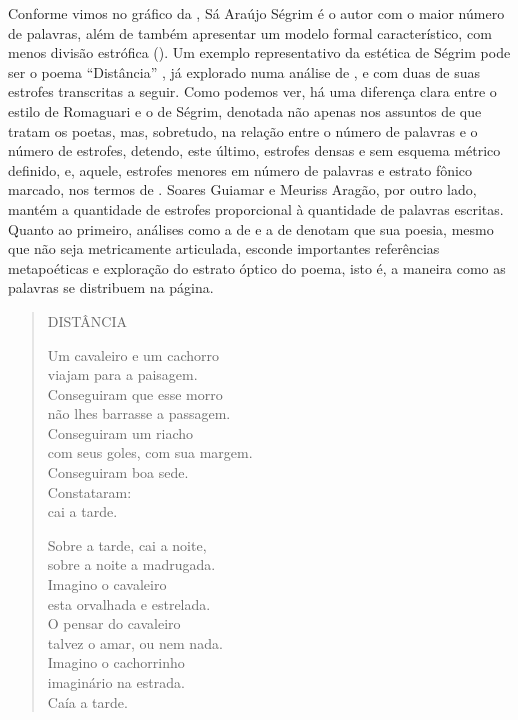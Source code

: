 \documentclass[portuguese]{textolivre}
\begin{document}
Conforme vimos no gráfico da , Sá Araújo Ségrim é o autor com o maior número de palavras, além de também apresentar um modelo formal característico, com menos divisão estrófica (). Um exemplo representativo da estética de Ségrim pode ser o poema “Distância” \cite[p. 112]{rosa_ave_1985}, já explorado numa análise de \textcite{rossi_as_2007}, e com duas de suas estrofes transcritas a seguir. Como podemos ver, há uma diferença clara entre o estilo de Romaguari e o de Ségrim, denotada não apenas nos assuntos de que tratam os poetas, mas, sobretudo, na relação entre o número de palavras e o número de estrofes, detendo, este último, estrofes densas e sem esquema métrico definido, e, aquele, estrofes menores em número de palavras e estrato fônico marcado, nos termos de \textcite{ramos_fenomenologia_2011}. Soares Guiamar e Meuriss Aragão, por outro lado, mantém a quantidade de estrofes proporcional à quantidade de palavras escritas. Quanto ao primeiro, análises como a de \textcite{vital_uma_2021} e a de \textcite{rossi_as_2007} denotam que sua poesia, mesmo que não seja metricamente articulada, esconde importantes referências metapoéticas e exploração do estrato óptico do poema, isto é, a maneira como as palavras se distribuem na página. 

\begin{quote}
DISTÂNCIA

Um cavaleiro e um cachorro\\
viajam para a paisagem.\\
Conseguiram que esse morro\\
não lhes barrasse a passagem.\\
Conseguiram um riacho\\
com seus goles, com sua margem.\\
Conseguiram boa sede.\\
Constataram:\\
cai a tarde.

Sobre a tarde, cai a noite,\\
sobre a noite a madrugada.\\
Imagino o cavaleiro\\
esta orvalhada e estrelada.\\
O pensar do cavaleiro\\
talvez o amar, ou nem nada.\\
Imagino o cachorrinho\\
imaginário na estrada.\\
Caía a tarde.
\end{quote}
\end{document}
